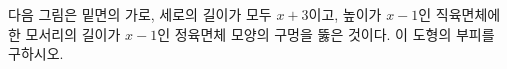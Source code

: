 다음 그림은 밑면의 가로, 세로의 길이가 모두 $x+3$이고, 높이가 $x-1$인 직육면체에 한 모서리의 길이가 $x-1$인 정육면체 모양의 구멍을 뚫은 것이다. 이 도형의 부피를 구하시오.
\par\smallskip\begin{center}\resizebox{\ifdim\width>\linewidth\linewidth\else\width\fi}{!}{}\end{center}
